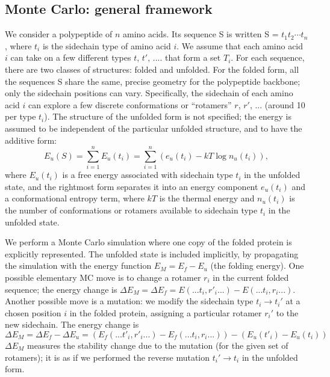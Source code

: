 \subsection{Monte Carlo: general framework}
We consider a polypeptide of $n$ amino acids. Its sequence S is written  S = $t_1 t_2 \cdots t_n$, where $t_i$ is
the sidechain type of amino acid $i$. We assume that each amino acid $i$ can take on a few different types $t$,
$t'$, .... that form a set $T_i$. For each sequence, there are two classes of structures: folded and unfolded.
For the folded form, all the sequences S share the same, precise geometry for the polypeptide backbone; only the
sidechain positions can vary. Specifically, the sidechain of each amino acid $i$ can explore a few discrete
conformations or ``rotamers'' $r$, $r'$, ... (around 10 per type $t_i$). The structure of the unfolded form is not
specified; the energy is assumed to be independent of the particular unfolded structure, and to have the additive form:
\begin{equation}  \label{eq:unfolded}
E_u(S) = \sum_{i=1}^n E_u(t_i) = \sum_{i=1}^n \left( e_u(t_i) - kT \log n_u(t_i) \right),
\end{equation}
where $E_u(t_i)$ is a free energy associated with sidechain type $t_i$ in the unfolded state, and the rightmost form
separates it into an energy component $e_u(t_i)$ and a conformational entropy term, where $kT$ is the thermal energy
and $n_u(t_i)$ is the number of conformations or rotamers available to sidechain type $t_i$ in the unfolded state.

We perform a Monte Carlo simulation \cite{Metropolis53,FrenkelBK,GrimmetBK} where one copy of the folded protein
is explicitly represented. The unfolded state is included implicitly, by propagating the simulation with the energy
function $E_M = E_f - E_u$ (the folding energy). One possible elementary MC move is to change a rotamer $r_i$ in the
current folded sequence; the energy change is $\Delta E_M = \Delta E_f = E(... t_i,r'_i ...) - E(... t_i,r_i ...)$.
Another possible move is a mutation: we modify the sidechain type $t_i \rightarrow t_i'$ at a chosen position $i$
in the folded protein, assigning a particular rotamer $r_i'$ to the new sidechain. The energy change is
\begin{equation}  \label{eq:deltaE}
\Delta E_M = \Delta E_f - \Delta E_u =
\left( E_f(... t'_i,r'_i ...) - E_f(... t_i,r_i ...) \right) - \left( E_u(t'_i) - E_u(t_i) \right) 
\end{equation}
$\Delta E_M$ measures the stability change due to the mutation (for the given set of rotamers); it is as if we
performed the reverse mutation $t_i' \rightarrow t_i$ in the unfolded form. 

